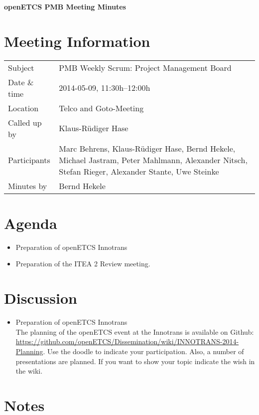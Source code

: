 \documentclass[a4paper, 11pt]{article}
\begin{document}
{\begin{center}\huge\bf openETCS PMB Meeting Minutes\end{center}}
\section{Meeting Information}

\renewcommand{\arraystretch}{1.5}
\begin{supertabular}{m{.2\textwidth}m{.8\textwidth}}
Subject & PMB Weekly Scrum: Project Management Board\\
Date \& time & 2014-05-09, 11:30h--12:00h\\
Location & Telco and Goto-Meeting\\
Called up by & Klaus-R\"udiger Hase\\
Participants &
Marc Behrens,
Klaus-R\"udiger Hase,
Bernd Hekele,
Michael Jastram,
Peter Mahlmann,
Alexander Nitsch,
Stefan Rieger,
Alexander Stante,
Uwe Steinke
\\

Minutes by & Bernd Hekele\\

\end{supertabular}
\renewcommand{\arraystretch}{1.0}


\section{{Agenda}}

\begin{itemize}
\item Preparation of openETCS \@ Innotrans
\item Preparation of the ITEA 2 Review meeting.
\end{itemize}

\section{Discussion}
\begin{itemize}
\item Preparation of openETCS \@ Innotrans\\
The planning of the openETCS event at the Innotrans is available on Github: \url{https://github.com/openETCS/Dissemination/wiki/INNOTRANS-2014-Planning}. Use the doodle to indicate your participation.
Also, a number of presentations are planned. If you want to show your topic indicate the wish in the wiki.



\end{itemize}

\section{Notes}
\end{document}
